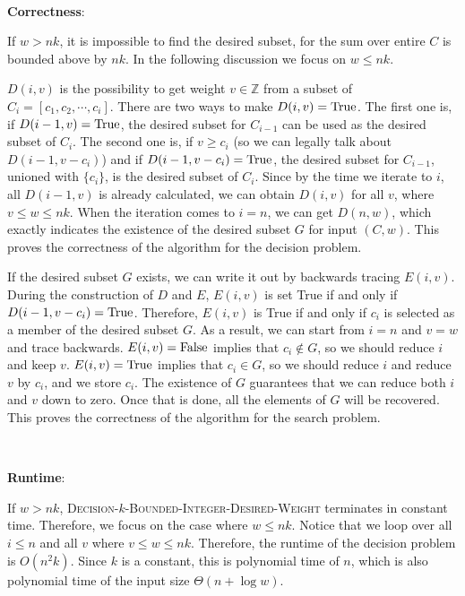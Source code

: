 \documentclass{article}
\begin{document}
~

\noindent\textbf{Correctness}:

If $w>nk$, it is impossible to find the desired subset, for the sum over entire $C$ is bounded above by $nk$. In the following discussion we focus on $w\leqslant nk$.

$D(i,v)$ is the possibility to get weight $v\in\mathbb{Z}$ from a subset of $C_i=[c_1,c_2,\cdots,c_i]$. There are two ways to make $D(i,v)=\textup{True}$. The first one is, if $D(i-1,v)=\textup{True}$, the desired subset for $C_{i-1}$ can be used as the desired subset of $C_i$. The second one is, if $v\geqslant c_i$ (so we can legally talk about $D(i-1,v-c_i)$) and if $D(i-1,v-c_i)=\textup{True}$, the desired subset for $C_{i-1}$, unioned with $\{c_i\}$, is the desired subset of $C_i$. Since by the time we iterate to $i$, all $D(i-1,v)$ is already calculated, we can obtain $D(i,v)$ for all $v$, where $v\leqslant w\leqslant nk$. When the iteration comes to $i=n$, we can get $D(n,w)$, which exactly indicates the existence of the desired subset $G$ for input $(C,w)$. This proves the correctness of the algorithm for the decision problem.

If the desired subset $G$ exists, we can write it out by backwards tracing $E(i,v)$. During the construction of $D$ and $E$, $E(i,v)$ is set True if and only if $D(i-1,v-c_i)=\textup{True}$. Therefore, $E(i,v)$ is True if and only if $c_i$ is selected as a member of the desired subset $G$. As a result, we can start from $i=n$ and $v=w$ and trace backwards. $E(i,v)=\textup{False}$ implies that $c_i\notin G$, so we should reduce $i$ and keep $v$. $E(i,v)=\textup{True}$ implies that $c_i\in G$, so we should reduce $i$ and reduce $v$ by $c_i$, and we store $c_i$. The existence of $G$ guarantees that we can reduce both $i$ and $v$ down to zero. Once that is done, all the elements of $G$ will be recovered. This proves the correctness of the algorithm for the search problem.

~

\noindent\textbf{Runtime}:

If $w>nk$, \textsc{Decision-$k$-Bounded-Integer-Desired-Weight} terminates in constant time. Therefore, we focus on the case where $w\leqslant nk$. Notice that we loop over all $i\leqslant n$ and all $v$ where $v\leqslant w\leqslant nk$. Therefore, the runtime of the decision problem is $O(n^2k)$. Since $k$ is a constant, this is polynomial time of $n$, which is also polynomial time of the input size $\Theta(n+\log w)$.
\end{document}
